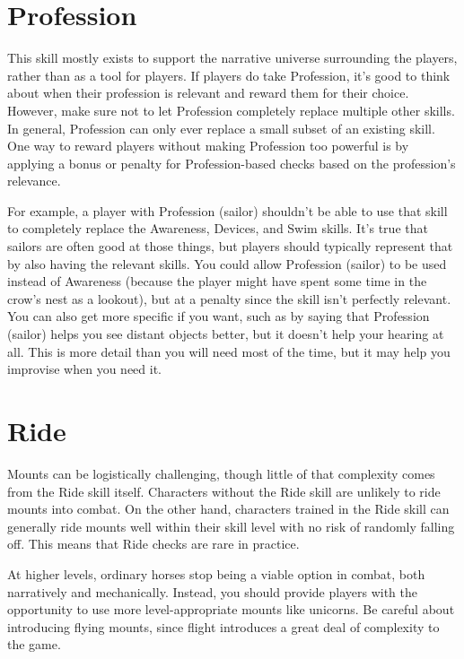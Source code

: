 \section{Profession}
  This skill mostly exists to support the narrative universe surrounding the players, rather than as a tool for players.
  If players do take Profession, it's good to think about when their profession is relevant and reward them for their choice.
  However, make sure not to let Profession completely replace multiple other skills.
  In general, Profession can only ever replace a small subset of an existing skill.
  One way to reward players without making Profession too powerful is by applying a bonus or penalty for Profession-based checks based on the profession's relevance.

  For example, a player with Profession (sailor) shouldn't be able to use that skill to completely replace the Awareness, Devices, and Swim skills.
  It's true that sailors are often good at those things, but players should typically represent that by also having the relevant skills.
  You could allow Profession (sailor) to be used instead of Awareness (because the player might have spent some time in the crow's nest as a lookout), but at a penalty since the skill isn't perfectly relevant.
  You can also get more specific if you want, such as by saying that Profession (sailor) helps you see distant objects better, but it doesn't help your hearing at all.
  This is more detail than you will need most of the time, but it may help you improvise when you need it.

\section{Ride}
  Mounts can be logistically challenging, though little of that complexity comes from the Ride skill itself.
  Characters without the Ride skill are unlikely to ride mounts into combat.
  On the other hand, characters trained in the Ride skill can generally ride mounts well within their skill level with no risk of randomly falling off.
  This means that Ride checks are rare in practice.

  At higher levels, ordinary horses stop being a viable option in combat, both narratively and mechanically.
  Instead, you should provide players with the opportunity to use more level-appropriate mounts like unicorns.
  Be careful about introducing flying mounts, since flight introduces a great deal of complexity to the game.

